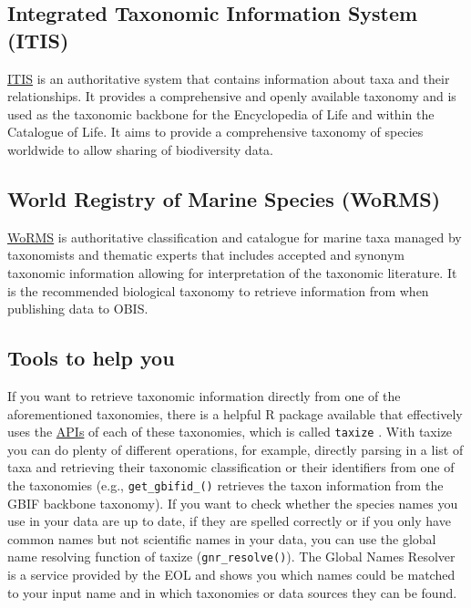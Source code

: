\documentclass[
  oneside]{book}
\begin{document}
\subsection{Integrated Taxonomic Information System (ITIS)}\label{integrated-taxonomic-information-system-itis}

\href{https://www.itis.gov/}{ITIS} is an authoritative system that contains information about taxa and their relationships. It provides a comprehensive and openly available taxonomy and is used as the taxonomic backbone for the Encyclopedia of Life and within the Catalogue of Life. It aims to provide a comprehensive taxonomy of species worldwide to allow sharing of biodiversity data.

\subsection{World Registry of Marine Species (WoRMS)}\label{world-registry-of-marine-species-worms}

\href{https://www.marinespecies.org/}{WoRMS} is authoritative classification and catalogue for marine taxa managed by taxonomists and thematic experts that includes accepted and synonym taxonomic information allowing for interpretation of the taxonomic literature. It is the recommended biological taxonomy to retrieve information from when publishing data to OBIS.

\subsection{Tools to help you}\label{tools-to-help-you-3}

If you want to retrieve taxonomic information directly from one of the aforementioned taxonomies, there is a helpful R package available that effectively uses the \hyperref[API]{APIs} of each of these taxonomies, which is called \texttt{taxize} \autocite{R-taxize}. With taxize you can do plenty of different operations, for example, directly parsing in a list of taxa and retrieving their taxonomic classification or their identifiers from one of the taxonomies (e.g., \texttt{get\_gbifid\_()} retrieves the taxon information from the GBIF backbone taxonomy). If you want to check whether the species names you use in your data are up to date, if they are spelled correctly or if you only have common names but not scientific names in your data, you can use the global name resolving function of taxize (\texttt{gnr\_resolve()}). The Global Names Resolver is a service provided by the EOL and shows you which names could be matched to your input name and in which taxonomies or data sources they can be found.
\end{document}
